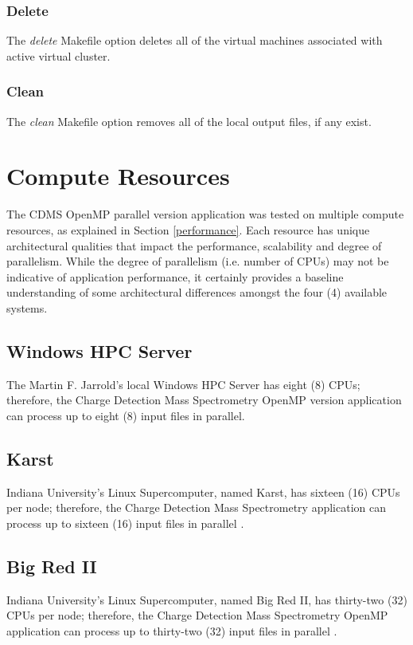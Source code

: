 \documentclass[9pt,twocolumn,twoside]{../../styles/osajnl}
\begin{document}
\subsubsection{Delete}
The \emph{delete} Makefile option deletes all of the virtual machines
associated with active virtual cluster.

\subsubsection{Clean}
The \emph{clean} Makefile option removes all of the local output
files, if any exist.

\section{Compute Resources} \label{resources}
The CDMS OpenMP parallel version application was tested on multiple
compute resources, as explained in Section \ref{performance}. Each
resource has unique architectural qualities that impact the
performance, scalability and degree of parallelism. While the degree
of parallelism (i.e. number of CPUs) may not be indicative of
application performance, it certainly provides a baseline
understanding of some architectural differences amongst the four (4)
available systems.

\subsection{Windows HPC Server}
The Martin F. Jarrold's local Windows HPC Server has eight (8) CPUs;
therefore, the Charge Detection Mass Spectrometry OpenMP version
application can process up to eight (8) input files in parallel.

\subsection{Karst}
Indiana University's Linux Supercomputer, named Karst, has sixteen
(16) CPUs per node; therefore, the Charge Detection Mass Spectrometry
application can process up to sixteen (16) input files in parallel
\cite{www-karst}.

\subsection{Big Red II}
Indiana University's Linux Supercomputer, named Big Red II, has
thirty-two (32) CPUs per node; therefore, the Charge Detection Mass
Spectrometry OpenMP application can process up to thirty-two (32)
input files in parallel \cite{www-br2}.
\end{document}
